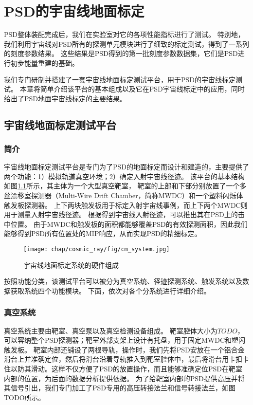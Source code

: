 \chapter{PSD的宇宙线地面标定}
\label{ch:cosmic_ray}
PSD整体装配完成后，我们在实验室对它的各项性能指标进行了测试。
特别地，我们利用宇宙线对PSD所有的探测单元模块进行了细致的标定测试，得到了一系列的刻度参数结果。
这些结果是PSD得到的第一批刻度参数数据集，它们是PSD进行初步能量重建的基础。

我们专门研制并搭建了一套宇宙线地面标定测试平台，用于PSD的宇宙线标定测试。
本章将简单介绍该平台的基本组成以及它在PSD宇宙线标定中的应用，同时给出了PSD地面宇宙线标定的主要结果。

\section{宇宙线地面标定测试平台}
\label{sec:cosmic_ray:cm_system}
\subsection{简介}
\label{sec:cosmic_ray:introduction}
宇宙线地面标定测试平台是专门为了PSD的地面标定而设计和建造的，主要提供了两个功能：1）模拟轨道真空环境；2）确定入射宇宙线径迹。
该平台的基本结构如图\ref{fig:cosmic_ray:cm_system}所示，其主体为一个大型真空靶室，
靶室的上部和下部分别放置了一个多丝漂移室探测器（Multi-Wire Drift Chamber，简称MWDC）和一个塑料闪烁体触发板探测器。
上下两块触发板用于标定入射宇宙线事例，而上下两个MWDC则用于测量入射宇宙线径迹。
根据得到宇宙线入射径迹，可以推出其在PSD上的击中位置。
由于MWDC和触发板的面积都能够覆盖PSD的有效探测面积，因此我们能够得到PSD所有位置处的MIP响应，从而实现PSD的精细标定。
\begin{figure}[htbp]
	\centering
	\texttt{[image: chap/cosmic\_ray/fig/cm\_system.jpg]}
	\caption{宇宙线地面标定系统的硬件组成}
	\label{fig:cosmic_ray:cm_system}
\end{figure}

按照功能分类，该测试平台可以被分为真空系统、径迹探测系统、触发系统以及数据获取系统四个功能模块。
下面，依次对各个分系统进行详细介绍。

\subsection{真空系统}
\label{sec:cosmic_ray:vacuum_system}
真空系统主要由靶室、真空泵以及真空检测设备组成。
靶室腔体大小为$TODO$，可以容纳整个PSD探测器；靶室外部支架上设计有托盘，用于固定MWDC和塑闪触发板。
靶室内部还铺设了两根导轨，操作时，我们先将PSD安放在一个铝合金滑台上并准确定位，然后将滑台沿着导轨推入到靶室腔体中，最后将滑台用卡扣卡住以防其滑动。这样不仅方便了PSD的放置操作，而且能够准确定位PSD在靶室内部的位置，为后面的数据分析提供依据。
为了给靶室内部的PSD提供高压并将其信号引出，我们专门加工了PSD专用的高压转接法兰和信号转接法兰，如图TODO所示。

